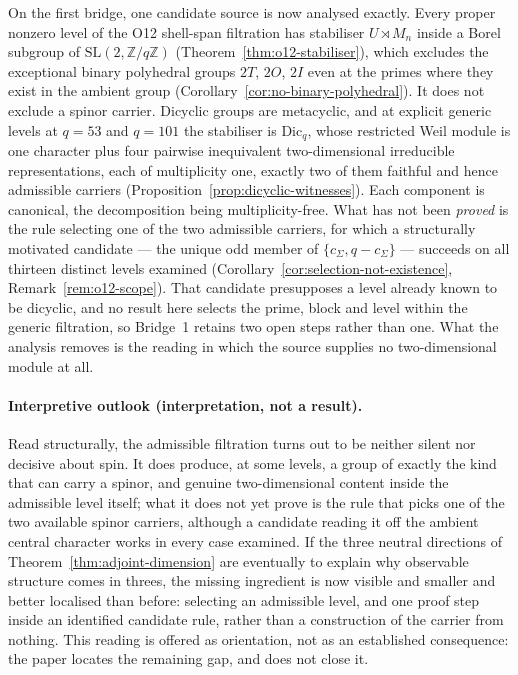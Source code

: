 \documentclass[11pt,a4paper]{article}
\newcommand{\SL}{\mathrm{SL}}
\begin{document}
  On the first bridge, one candidate source is now analysed exactly.
  Every proper nonzero level of the O12 shell-span filtration has stabiliser $U \rtimes M_{n}$
  inside a Borel subgroup of $\SL(2,\mathbb{Z}/q\mathbb{Z})$
  (Theorem~\ref{thm:o12-stabiliser}), which excludes the exceptional binary polyhedral groups
  $2T$, $2O$, $2I$ even at the primes where they exist in the ambient group
  (Corollary~\ref{cor:no-binary-polyhedral}).
  It does not exclude a spinor carrier.
  Dicyclic groups are metacyclic, and at explicit generic levels at $q = 53$ and $q = 101$ the
  stabiliser is $\mathrm{Dic}_{q}$, whose restricted Weil module is one character plus four
  pairwise inequivalent two-dimensional irreducible representations, each of multiplicity one,
  exactly two of them faithful and hence admissible carriers
  (Proposition~\ref{prop:dicyclic-witnesses}).
  Each component is canonical, the decomposition being multiplicity-free.
  What has not been \emph{proved} is the rule selecting one of the two admissible carriers, for
  which a structurally motivated candidate --- the unique odd member of
  $\{c_{\Sigma}, q - c_{\Sigma}\}$ --- succeeds on all thirteen distinct levels examined
  (Corollary~\ref{cor:selection-not-existence}, Remark~\ref{rem:o12-scope}).
  That candidate presupposes a level already known to be dicyclic, and no result here selects
  the prime, block and level within the generic filtration, so Bridge~1 retains two open steps
  rather than one.
  What the analysis removes is the reading in which the source supplies no two-dimensional
  module at all.

  \paragraph{Interpretive outlook (interpretation, not a result).}
    Read structurally, the admissible filtration turns out to be neither silent nor decisive
    about spin.
    It does produce, at some levels, a group of exactly the kind that can carry a spinor, and
    genuine two-dimensional content inside the admissible level itself; what it does not
    yet prove is the rule that picks one of the two available spinor carriers, although a
    candidate reading it off the ambient central character works in every case examined.
    If the three neutral directions of Theorem~\ref{thm:adjoint-dimension} are eventually to
    explain why observable structure comes in threes, the missing ingredient is now visible and
    smaller and better localised than before: selecting an admissible level, and one proof step
    inside an identified candidate rule, rather than a construction of the carrier from
    nothing.
    This reading is offered as orientation, not as an established consequence: the paper locates
    the remaining gap, and does not close it.
\end{document}
